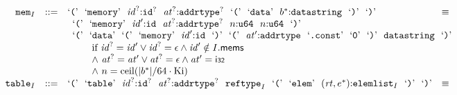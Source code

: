 $$
\begin{array}[t]{@{}lrrl@{}l@{}l@{}l@{}}
& {{\mathtt{mem}}}_{I} & ::= & \mbox{‘\texttt{{(}}’}~~\mbox{‘\texttt{memory}’}~~{{\mathit{id}}^?}{:}{{\mathtt{id}}^?}~~{{\mathit{at}}^?}{:}{{\mathtt{addrtype}}^?}~~\mbox{‘\texttt{{(}}’}~~\mbox{‘\texttt{data}’}~~{b^\ast}{:}{\mathtt{datastring}}~~\mbox{‘\texttt{{)}}’}~~\mbox{‘\texttt{{)}}’} & \quad\equiv\quad{} & & \\
&&& \multicolumn{4}{@{}l@{}}{\quad
\begin{array}[t]{@{}l@{}l@{}l@{}}
\begin{array}[t]{@{}l@{}} \mbox{‘\texttt{{(}}’}~~\mbox{‘\texttt{memory}’}~~{\mathit{id}'}{:}{\mathtt{id}}~~{{\mathit{at}}^?}{:}{{\mathtt{addrtype}}^?}~~n{:}{\mathtt{u64}}~~n{:}{\mathtt{u64}}~~\mbox{‘\texttt{{)}}’} \\
  \mbox{‘\texttt{{(}}’}~~\mbox{‘\texttt{data}’}~~\mbox{‘\texttt{{(}}’}~~\mbox{‘\texttt{memory}’}~~{\mathit{id}'}{:}{\mathtt{id}}~~\mbox{‘\texttt{{)}}’}~~\mbox{‘\texttt{{(}}’}~~{\mathit{at}'}{:}{\mathtt{addrtype}}~~\mbox{‘\texttt{.const}’}~~\mbox{‘\texttt{0}’}~~\mbox{‘\texttt{{)}}’}~~{\mathtt{datastring}}~~\mbox{‘\texttt{{)}}’} \end{array} & & \\
 \multicolumn{3}{@{}l@{}}{\quad
\begin{array}[t]{@{}l@{}}
\quad
\begin{array}[t]{@{}l@{}}
\mbox{if}~ {{\mathit{id}}^?} = {\mathit{id}'} \lor {{\mathit{id}}^?} = \epsilon \land {\mathit{id}'} \notin I{.}\mathsf{mems} \\
{\land}~ {{\mathit{at}}^?} = {\mathit{at}'} \lor {{\mathit{at}}^?} = \epsilon \land {\mathit{at}'} = \mathsf{i{\scriptstyle 32}} \\
{\land}~ n = {\mathrm{ceil}}({|{b^\ast}|} / 64 \cdot {\mathrm{Ki}}) \\
\end{array} \\
\end{array}
} \\
\end{array}
} \\
& {{\mathtt{table}}}_{I} & ::= & \mbox{‘\texttt{{(}}’}~~\mbox{‘\texttt{table}’}~~{{\mathit{id}}^?}{:}{{\mathtt{id}}^?}~~{{\mathit{at}}^?}{:}{{\mathtt{addrtype}}^?}~~{{\mathtt{reftype}}}_{I}~~\mbox{‘\texttt{{(}}’}~~\mbox{‘\texttt{elem}’}~~({\mathit{rt}}, {e^\ast}){:}{{\mathtt{elemlist}}}_{I}~~\mbox{‘\texttt{{)}}’}~~\mbox{‘\texttt{{)}}’} & \quad\equiv\quad{} & & \\
&&& \multicolumn{4}{@{}l@{}}{\quad
}
\end{array}$$

